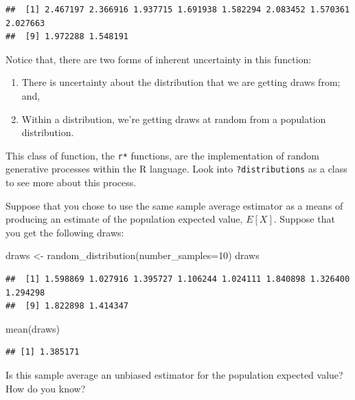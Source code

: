 \documentclass[
]{book}
\newenvironment{Shaded}{\begin{snugshade}}{\end{snugshade}}
\newcommand{\AttributeTok}[1]{\textcolor[rgb]{0.77,0.63,0.00}{#1}}
\newcommand{\DecValTok}[1]{\textcolor[rgb]{0.00,0.00,0.81}{#1}}
\newcommand{\FunctionTok}[1]{\textcolor[rgb]{0.00,0.00,0.00}{#1}}
\newcommand{\NormalTok}[1]{#1}
\newcommand{\OtherTok}[1]{\textcolor[rgb]{0.56,0.35,0.01}{#1}}
\providecommand{\tightlist}{%
  \setlength{\itemsep}{0pt}\setlength{\parskip}{0pt}}
\theoremstyle{definition}
\theoremstyle{definition}
\theoremstyle{definition}
\theoremstyle{definition}
\theoremstyle{remark}
\begin{document}
\begin{verbatim}
##  [1] 2.467197 2.366916 1.937715 1.691938 1.582294 2.083452 1.570361 2.027663
##  [9] 1.972288 1.548191
\end{verbatim}

Notice that, there are two forms of inherent uncertainty in this function:

\begin{enumerate}
\def\labelenumi{\arabic{enumi}.}
\tightlist
\item
  There is uncertainty about the distribution that we are getting draws from; and,
\item
  Within a distribution, we're getting draws at random from a population distribution.
\end{enumerate}

This class of function, the \texttt{r*} functions, are the implementation of random generative processes within the R language. Look into \texttt{?distributions} as a class to see more about this process.

Suppose that you chose to use the same sample average estimator as a means of producing an estimate of the population expected value, \(E[X]\). Suppose that you get the following draws:

\begin{Shaded}
\begin{Highlighting}[]
\NormalTok{draws }\OtherTok{\textless{}{-}} \FunctionTok{random\_distribution}\NormalTok{(}\AttributeTok{number\_samples=}\DecValTok{10}\NormalTok{)}
\NormalTok{draws}
\end{Highlighting}
\end{Shaded}

\begin{verbatim}
##  [1] 1.598869 1.027916 1.395727 1.106244 1.024111 1.840898 1.326400 1.294298
##  [9] 1.822898 1.414347
\end{verbatim}

\begin{Shaded}
\begin{Highlighting}[]
\FunctionTok{mean}\NormalTok{(draws)}
\end{Highlighting}
\end{Shaded}

\begin{verbatim}
## [1] 1.385171
\end{verbatim}

Is this sample average an unbiased estimator for the population expected value? How do you know?
\end{document}

